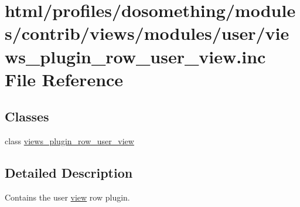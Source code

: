 \hypertarget{views__plugin__row__user__view_8inc}{
\section{html/profiles/dosomething/modules/contrib/views/modules/user/views\_\-plugin\_\-row\_\-user\_\-view.inc File Reference}
\label{views__plugin__row__user__view_8inc}
}
\subsection*{Classes}
\begin{DoxyCompactItemize}
\item 
class \hyperlink{classviews__plugin__row__user__view}{views\_\-plugin\_\-row\_\-user\_\-view}
\end{DoxyCompactItemize}


\subsection{Detailed Description}
Contains the user \hyperlink{classview}{view} row plugin. 